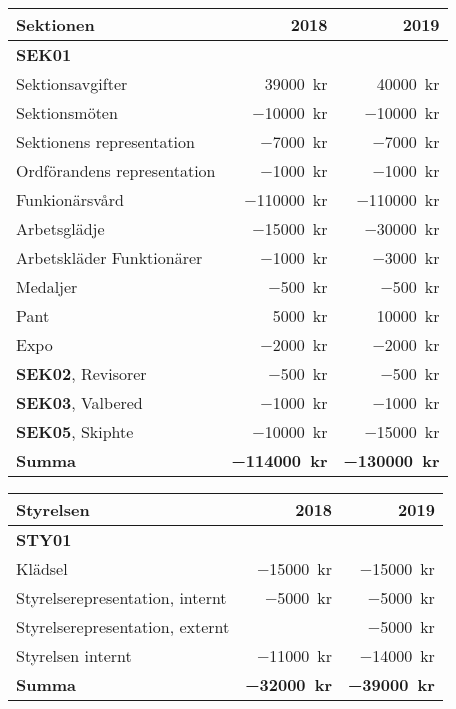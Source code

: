 \documentclass[10pt]{article}
\begin{document}
    \section*{\doctitle}
    \begin{tabularx}{10cm}{X r r}
        \textbf{\large Sektionen} & \textbf{2018} & \textbf{2019} \\
        \hline
        \textbf{SEK01} \\
        Sektionsavgifter & \SI{39000}{kr} & \SI{40000}{kr} \\
        Sektionsmöten & \SI{-10000}{kr} & \SI{-10000}{kr} \\
        Sektionens representation & \SI{-7000}{kr} & \SI{-7000}{kr} \\
        Ordförandens representation & \SI{-1000}{kr} & \SI{-1000}{kr} \\
        Funkionärsvård & \SI{-110000}{kr} & \SI{-110000}{kr} \\
        Arbetsglädje & \SI{-15000}{kr} & \SI{-30000}{kr} \\
        Arbetskläder Funktionärer & \SI{-1000}{kr} & \SI{-3000}{kr} \\
        Medaljer & \SI{-500}{kr} & \SI{-500}{kr} \\
        Pant & \SI{5000}{kr} & \SI{10000}{kr} \\
        Expo & \SI{-2000}{kr} & \SI{-2000}{kr} \\
        \textbf{SEK02}, Revisorer & \SI{-500}{kr} & \SI{-500}{kr} \\
        \textbf{SEK03}, Valbered & \SI{-1000}{kr} & \SI{-1000}{kr} \\
        \textbf{SEK05}, Skiphte & \SI{-10000}{kr} & \SI{-15000}{kr} \\
        \hline
        \textbf{Summa} & \textbf{\SI{-114000}{kr}} & \textbf{\SI{-130000}{kr}} \\
    \end{tabularx}
    
    \begin{tabularx}{10cm}{X r r}
        \textbf{\large Styrelsen} & \textbf{2018} & \textbf{2019} \\
        \hline
        \textbf{STY01} \\
        Klädsel & \SI{-15000}{kr} & \SI{-15000}{kr} \\
        Styrelserepresentation, internt & \SI{-5000}{kr} & \SI{-5000}{kr} \\
        Styrelserepresentation, externt & \SI{}{} & \SI{-5000}{kr} \\
        Styrelsen internt & \SI{-11000}{kr} & \SI{-14000}{kr} \\
        \hline
        \textbf{Summa} & \textbf{\SI{-32000}{kr}} & \textbf{\SI{-39000}{kr}} \\
    \end{tabularx}
    
\end{document}
